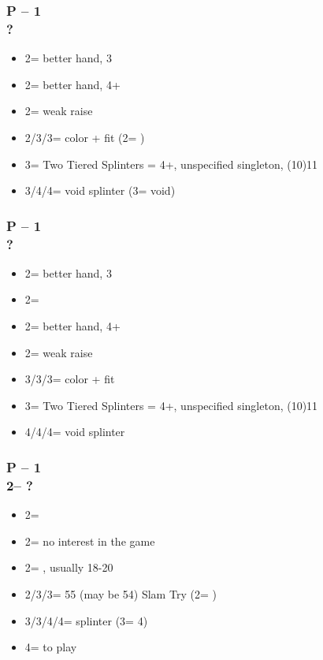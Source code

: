 \documentclass[12pt, a4paper]{report}
\begin{document}
{{{            \subsubsection*{P -- 1\hearts \\ ?}
            \begin{itemize}
                \item 2\clubs = better hand, 3\hearts
                \item 2\diams = better hand, 4+\hearts
                \item 2\hearts = weak raise
                \item 2\nt/3\clubs/3\diams = color + fit (2\nt = \spades)
                \item 3\spades = Two Tiered Splinters = 4+\hearts, unspecified singleton, (10)11\dps
                \item 3\nt/4\clubs/4\diams = void splinter (3\nt = \spades void)
            \end{itemize}

            \subsubsection*{P -- 1\spades \\ ?}
            \begin{itemize}
                \item 2\clubs = better hand, 3\spades
                \item 2\diams = \trsf{\hearts}
                \item 2\hearts = better hand, 4+\spades
                \item 2\spades = weak raise
                \item 3\clubs/3\diams/3\hearts = color + fit
                \item 3\nt = Two Tiered Splinters = 4+\spades, unspecified singleton, (10)11\dps
                \item 4\clubs/4\diams/4\hearts = void splinter
            \end{itemize}

            \subsubsection*{P -- 1\hearts \\ 2\clubs -- ?}
            \begin{itemize}
                \item 2\diams = \inv
                \item 2\hearts = no interest in the game
                \item 2\spades = \ahsf, usually 18-20 \bal
                \item 2\nt/3\clubs/3\diams = 55 (may be 54) Slam Try (2\nt = \spades)
                \item 3\nt/3\spades/4\clubs/4\diams = splinter (3\nt = 4\diams)
                \item 4\hearts = to play
            \end{itemize}

}}}
\end{document}
